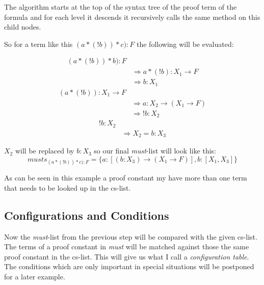 The algorithm starts at the top of the syntax tree of the proof term of the formula and for each level it descends it recursively calls the same method on this child nodes.

So for a term like this $(a*(!b))*c):F$ the following will be evaluated:

\begin{equation}\label{musts}
\begin{split}
	(a*(!b))*b):F \\
	& \Rightarrow a*(!b):  X_1 \rightarrow F \\
	& \Rightarrow b:  X_1
\end{split}
\end{equation}
\begin{equation}\label{musts1}
\begin{split}
	(a*(!b)): X_1 \rightarrow F \\
	& \Rightarrow a: X_2 \rightarrow (X_1 \rightarrow F)\\
	& \Rightarrow !b: X_2
\end{split}
\end{equation}
\begin{equation}\label{musts2}
\begin{split}
	!b: X_2 \\
	& \Rightarrow X_2 = b:X_3
\end{split}
\end{equation}

$X_2$ will be replaced by $b:X_3$ so our final \emph{must}-list will look like this: 
\begin{equation}\label{must-list}
musts_{(a*(!b))*c):F} = \{a: [(b:X_3) \rightarrow (X_1 \rightarrow F)], b: [X_1, X_3] \}
\end{equation}

As can be seen in this example a proof constant my have more than one term that needs to be looked up in the cs-list.

\subsection{Configurations and Conditions}
Now the \emph{must}-list from the previous step will be compared with the given cs-list. The terms of a proof constant in \emph{must} will be matched against those the same proof constant in the cs-list. This will give us what I call a \emph{configuration table}. The conditions which are only important in special situations will be postponed for a later example.


